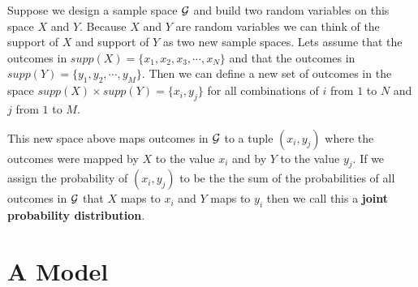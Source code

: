Suppose we design a sample space $\mathcal{G}$ and build two random variables on this space $X$ and $Y$.
Because $X$ and $Y$ are random variables we can think of the support of $X$ and support of $Y$ as two new sample spaces. Lets assume that the outcomes in $supp(X) = \{x_{1},x_{2},x_{3},\cdots,x_{N}\}$ and that the outcomes in $supp(Y) = \{y_{1},y_{2},\cdots,y_{M}\}$. 
Then we can define a new set of outcomes in the space $supp(X) \times supp(Y) = \{x_{i}, y_{j}\}$ for all combinations of $i$ from $1$ to $N$ and $j$ from $1$ to $M$.

This new space above maps outcomes in $\mathcal{G}$ to a tuple $(x_{i},y_{j})$  where the outcomes were mapped by $X$ to the value $x_{i}$ and by $Y$ to the value $y_{j}$. 
If we assign the probability of $(x_{i},y_{j})$ to be the the sum of the probabilities of all outcomes in $\mathcal{G}$ that $X$ maps to $x_{i}$ and $Y$ maps to $y_{i}$ then we call this a \textbf{joint probability distribution}. 






\section{A Model}
